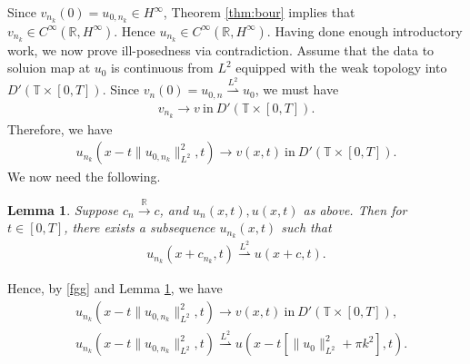 \documentclass[12pt,reqno]{amsart}
\numberwithin{equation}{section}  %
\newcommand{\rr}{\mathbb{R}}
\newcommand{\ci}{\mathbb{T}}
\newtheorem{lemma}[theorem]{Lemma}
\begin{document}
%
%
Since $v_{n_{k}}(0) = u_{0,n_{k}} \in
H^{\infty}$, Theorem \ref{thm:bour} implies that $v_{n_{k}}\in C^{\infty}(\rr,
H^{\infty})$. %
Hence $u_{n_{k}} \in C^{\infty}(\rr, H^{\infty})$. Having done
enough introductory work, we now prove ill-posedness via contradiction. 
Assume that the data to soluion map at $u_{0}$ is continuous from
$L^{2}$ equipped with the weak topology into $D'\left( \ci \times [0,T]
\right)$. Since $v_{n}(0) = u_{0,n} \overset{L^{2}}{\rightharpoonup}
u_{0}$, we must have %
%
\begin{equation*}
\begin{split}
  v_{n_{k}} \to v \ \text{in} \ D'\left( \ci \times [0,T] \right).
\end{split}
\end{equation*}
%
%
Therefore, we have
%
%
%
%
%
%
\begin{equation}
  \label{fgg}
\begin{split}
  u_{n_{k}}(x - t \| u_{0,n_{k}} \|_{L^{2}}^{2}, t) \to v(x,t) \ \text{in} \
  D'\left( \ci \times [0,T] \right).
\end{split}
\end{equation}
%
We now need the following.
%
%
%
%
%
%
%
%
%
%
%
%
%
%
%
%
%
%
%
%
%
%
\begin{lemma}
  Suppose $c_{n} \xrightarrow{\rr} c$, and $u_{n}(x,t), u(x,t)$ as above. Then
  for $t \in [0, T]$, there exists a subsequence $u_{n_{k}}(x,t)$ such that   
  \begin{equation*}
  \begin{split}
    u_{n_{k}}(x + c_{n_{k}}, t)\overset{L^{2}}{\rightharpoonup} u(x + c, t).
  \end{split}
  \end{equation*}
%
%
\label{lem:key-conv}
\end{lemma}
%
%
%
%
Hence, by \eqref{fgg} and Lemma \ref{lem:key-conv}, we have
%
%
\begin{equation*}
\begin{split}
& u_{n_{k}}(x - t \| u_{0,n_{k}} \|_{L^{2}}^{2}, t) \to v(x,t) \ \text{in} \
  D'\left( \ci \times [0,T] \right),
  \\
  & u_{n_{k}}(x - t \| u_{0,n_{k}} \|_{L^{2}}^{2}, t) 
  \overset{L^{2}}{\rightharpoonup}
  u(x - t [\| u_{0} \|_{L^{2}}^{2} + \pi k^{2}], t).
\end{split}
\end{equation*}
\end{document}
